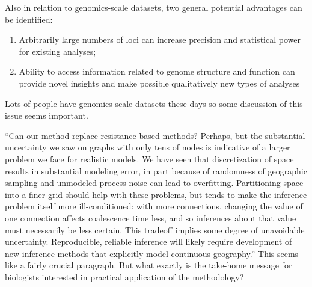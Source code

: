 
\begin{point}{}
    Also in relation to genomics-scale datasets, two general potential
    advantages can be identified:
    \begin{enumerate}
        \item       Arbitrarily large numbers of loci can increase precision
            and statistical power for existing analyses;
        \item       Ability to access information related to genome structure
            and function can provide novel insights and make possible
            qualitatively new types of analyses
    \end{enumerate}
    Lots of people have genomics-scale datasets these days so some discussion of
    this issue seems important.
\end{point}


\begin{point}{}
    ``Can our method replace resistance-based methods? Perhaps, but the substantial
    uncertainty we saw on graphs with only tens of nodes is indicative of a
    larger problem we face for realistic models. We have seen that
    discretization of space results in substantial modeling error, in part
    because of randomness of geographic sampling and unmodeled process noise
    can lead to overfitting. Partitioning space into a finer grid should help
    with these problems, but tends to make the inference problem itself more
    ill-conditioned: with more connections, changing the value of one
    connection affects coalescence time less, and so inferences about that
    value must necessarily be less certain. This tradeoff implies some degree
    of unavoidable uncertainty.  Reproducible, reliable inference will likely
    require development of new inference methods that explicitly model
    continuous geography.''  This seems like a fairly crucial paragraph.  But
    what exactly is the take-home message for biologists interested in
    practical application of the methodology?
\end{point}

